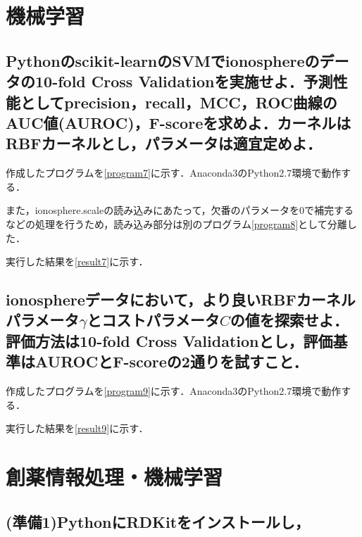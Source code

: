 \documentclass[uplatex,a4j]{jsarticle}
\begin{document}
  \section{機械学習}
  \subsection{Pythonのscikit-learnのSVMでionosphereのデータの10-fold Cross Validationを実施せよ．予測性能としてprecision，recall，MCC，ROC曲線のAUC値(AUROC)，F-scoreを求めよ．カーネルはRBFカーネルとし，パラメータは適宜定めよ．}
  作成したプログラムを\ref{program7}に示す．Anaconda3のPython2.7環境で動作する．
  
  また，ionosphere.scaleの読み込みにあたって，欠番のパラメータを0で補完するなどの処理を行うため，読み込み部分は別のプログラム\ref{program8}として分離した．
  
  実行した結果を\ref{result7}に示す．
  
  
  \subsection{ionosphereデータにおいて，より良いRBFカーネルパラメータ$\gamma$とコストパラメータ$C$の値を探索せよ．評価方法は10-fold Cross Validationとし，評価基準はAUROCとF-scoreの2通りを試すこと．}
  作成したプログラムを\ref{program9}に示す．Anaconda3のPython2.7環境で動作する．
  
  実行した結果を\ref{result9}に示す．
  
  
  \section{創薬情報処理・機械学習}
  \subsection{(準備1)PythonにRDKitをインストールし，}
  
\end{document}
